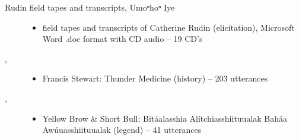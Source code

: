 \documentclass[output=paper]{LSP/langsci}
\begin{document}
\begin{description}
\item[Rudin field tapes and transcripts, Umoⁿhoⁿ Iye]\hfill
\begin{itemize}
\item field tapes and transcripts of Catherine Rudin (elicitation), Microsoft Word .doc format with CD audio -- 19 CD’s
\end{itemize}

\item[\citet{Wallace1993}, ]\hfill
\begin{itemize}
\item Francis Stewart: Thunder Medicine (history) -- 203 utterances
\end{itemize}

\item[\citet{YellowBrowShortBull1980}, ]\hfill
\begin{itemize}
\item Yellow Brow \& Short Bull: Bitáalasshia Alítchiasshiituualak Baháa Awúuasshiituualak (legend) -- 41 utterances
\end{itemize}

\end{description}

{\sloppy
\printbibliography[heading=subbibliography,notkeyword=this]
}
\end{document}

